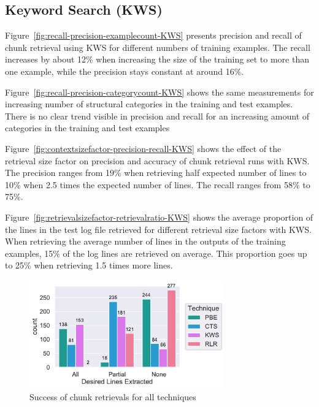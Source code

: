 \documentclass[\myrootdir/main.tex]{subfiles}
\begin{document}
\subsection{Keyword Search (KWS)}
Figure~\ref{fig:recall-precision-examplecount-KWS} presents precision and recall of chunk retrieval using KWS for different numbers of training examples.
The recall increases by about 12\% when increasing the size of the training set to more than one example, while the precision stays constant at around 16\%.

Figure~\ref{fig:recall-precision-categorycount-KWS} shows the same measurements for increasing number of structural categories in the training and test examples.
There is no clear trend visible in precision and recall for an increasing amount of categories in the training and test examples

Figure~\ref{fig:contextsizefactor-precision-recall-KWS} shows the effect of the retrieval size factor on precision and accuracy of chunk retrieval runs with KWS\@.
The precision ranges from 19\% when retrieving half expected number of lines to 10\% when 2.5 times the expected number of lines.
The recall ranges from 58\% to 75\%.

Figure~\ref{fig:retrievalsizefactor-retrievalratio-KWS} shows the average proportion of the lines in the test log file retrieved for different retrieval size factors with KWS\@.
When retrieving the average number of lines in the outputs of the training examples, 15\% of the log lines are retrieved on average.
This proportion goes up to 25\% when retrieving 1.5 times more lines.



\begin{figure}[htbp]
		\centering
		\includegraphics[width=0.75\textwidth, clip]{img/big-study/success-partial-all.pdf}
		\caption{Success of chunk retrievals for all techniques}
		\label{fig:success-partial-all}
\end{figure}
\end{document}
